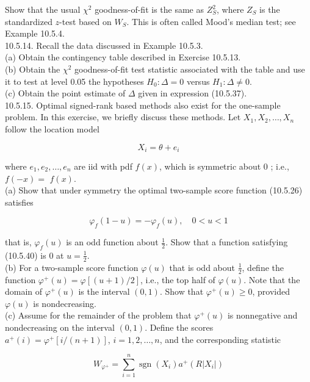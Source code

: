 Show that the usual $\chi^{2}$ goodness-of-fit is the same as $Z_{S}^{2}$, where $Z_{S}$ is the standardized $z$-test based on $W_{S}$. This is often called Mood's median test; see Example 10.5.4.\\
10.5.14. Recall the data discussed in Example 10.5.3.\\
(a) Obtain the contingency table described in Exercise 10.5.13.\\
(b) Obtain the $\chi^{2}$ goodness-of-fit test statistic associated with the table and use it to test at level 0.05 the hypotheses $H_{0}: \Delta=0$ versus $H_{1}: \Delta \neq 0$.\\
(c) Obtain the point estimate of $\Delta$ given in expression (10.5.37).\\
10.5.15. Optimal signed-rank based methods also exist for the one-sample problem. In this exercise, we briefly discuss these methods. Let $X_{1}, X_{2}, \ldots, X_{n}$ follow the location model


\begin{equation*}
X_{i}=\theta+e_{i} \tag{10.5.39}
\end{equation*}


where $e_{1}, e_{2}, \ldots, e_{n}$ are iid with pdf $f(x)$, which is symmetric about 0 ; i.e., $f(-x)=$ $f(x)$.\\
(a) Show that under symmetry the optimal two-sample score function (10.5.26) satisfies


\begin{equation*}
\varphi_{f}(1-u)=-\varphi_{f}(u), \quad 0<u<1 \tag{10.5.40}
\end{equation*}


that is, $\varphi_{f}(u)$ is an odd function about $\frac{1}{2}$. Show that a function satisfying (10.5.40) is 0 at $u=\frac{1}{2}$.\\
(b) For a two-sample score function $\varphi(u)$ that is odd about $\frac{1}{2}$, define the function $\varphi^{+}(u)=\varphi[(u+1) / 2]$, i.e., the top half of $\varphi(u)$. Note that the domain of $\varphi^{+}(u)$ is the interval $(0,1)$. Show that $\varphi^{+}(u) \geq 0$, provided $\varphi(u)$ is nondecreasing.\\
(c) Assume for the remainder of the problem that $\varphi^{+}(u)$ is nonnegative and nondecreasing on the interval $(0,1)$. Define the scores $a^{+}(i)=\varphi^{+}[i /(n+1)]$, $i=1,2, \ldots, n$, and the corresponding statistic


\begin{equation*}
W_{\varphi^{+}}=\sum_{i=1}^{n} \operatorname{sgn}\left(X_{i}\right) a^{+}\left(R\left|X_{i}\right|\right) \tag{10.5.41}
\end{equation*}



